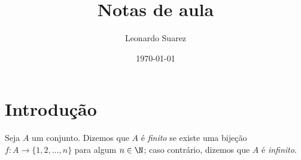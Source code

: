 \documentclass{tufte-handout}
\title{Notas de aula}
\author{Leonardo Suarez}
\date{\today}
\begin{document}
\maketitle
\section{Introdução}

\begin{defn}
    Seja \(A\) um conjunto. Dizemos que \(A\) é \emph{finito} se existe uma bijeção \(f : A \to \{1, 2, \ldots, n\}\) para algum \(n \in \N\); caso contrário, dizemos que \(A\) é \emph{infinito}.
\end{defn}



\end{document}
